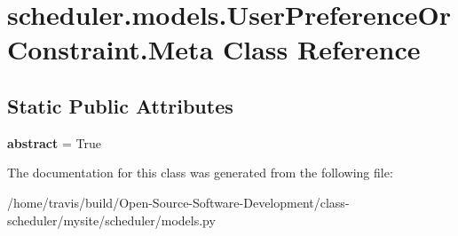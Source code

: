 \hypertarget{classscheduler_1_1models_1_1_user_preference_or_constraint_1_1_meta}{\section{scheduler.\-models.\-User\-Preference\-Or\-Constraint.\-Meta Class Reference}
\label{classscheduler_1_1models_1_1_user_preference_or_constraint_1_1_meta}
}
\subsection*{Static Public Attributes}
\begin{DoxyCompactItemize}
\item 
\hypertarget{classscheduler_1_1models_1_1_user_preference_or_constraint_1_1_meta_a96e43107f2412f8afb1c0c2d416d151e}{{\bfseries abstract} = True}\label{classscheduler_1_1models_1_1_user_preference_or_constraint_1_1_meta_a96e43107f2412f8afb1c0c2d416d151e}

\end{DoxyCompactItemize}


The documentation for this class was generated from the following file\-:\begin{DoxyCompactItemize}
\item 
/home/travis/build/\-Open-\/\-Source-\/\-Software-\/\-Development/class-\/scheduler/mysite/scheduler/models.\-py\end{DoxyCompactItemize}
